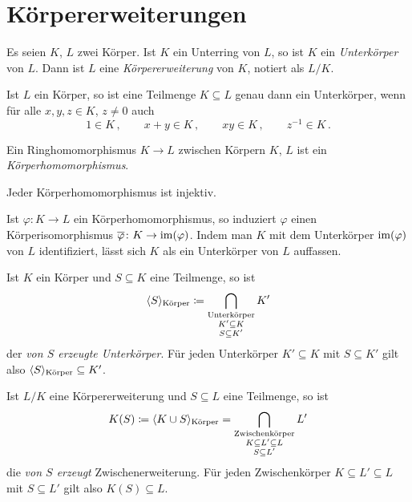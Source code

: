 \chapter{Körpererweiterungen}

\begin{definition}
  Es seien $K$, $L$ zwei Körper.
  Ist $K$ ein Unterring von $L$, so ist $K$ ein \emph{Unterkörper} von $L$.
  Dann ist $L$ eine \emph{Körpererweiterung} von $K$, notiert als $L/K$.
\end{definition}

\begin{lemma}
  Ist $L$ ein Körper, so ist eine Teilmenge $K \subseteq L$ genau dann ein Unterkörper, wenn für alle $x, y, z \in K$, $z \neq 0$ auch
  \[
    1 \in K \,,
    \qquad
    x + y \in K \,,
    \qquad
    xy \in K \,,
    \qquad
    z^{-1} \in K \,.
  \]

\end{lemma}

\begin{definition}
  Ein Ringhomomorphismus $K \to L$ zwischen Körpern $K$, $L$ ist ein \emph{Körperhomomorphismus}.
\end{definition}

\begin{lemma}
  Jeder Körperhomomorphismus ist injektiv.
\end{lemma}

Ist $\varphi \colon K \to L$ ein Körperhomomorphismus, so induziert $\varphi$ einen Körperisomorphismus $\overline{\varphi} \colon  K \to \operatorname{im}(\varphi)$.
Indem man $K$ mit dem Unterkörper $\operatorname{im}(\varphi)$ von $L$ identifiziert, lässt sich $K$ als ein Unterkörper von $L$ auffassen.

\begin{definition}
  Ist $K$ ein Körper und $S \subseteq K$ eine Teilmenge, so ist
  \[
              \langle S\rangle_{\text{Körper}}
    \coloneqq  \bigcap_{\substack{\text{Unterkörper} \\ K' \subseteq K \\S \subseteq K'}} K'
  \]
  der \emph{von $S$ erzeugte Unterkörper}.
  Für jeden Unterkörper $K' \subseteq K$ mit $S \subseteq K'$ gilt also $\langle S\rangle_{\text{Körper}} \subseteq K'$.

  Ist $L/K$ eine Körpererweiterung und $S \subseteq L$ eine Teilmenge, so ist
  \[
              K(S)
    \coloneqq  \langle K \cup S\rangle_{\text{Körper}}
    =         \bigcap_{\substack{\text{Zwischenkörper} \\ K \subseteq L' \subseteq L \\ S \subseteq L'}} L'
  \]
  die \emph{von $S$ erzeugt} Zwischenerweiterung.
  Für jeden Zwischenkörper $K \subseteq L' \subseteq L$ mit $S \subseteq L'$ gilt also $K(S) \subseteq L$.
\end{definition}





